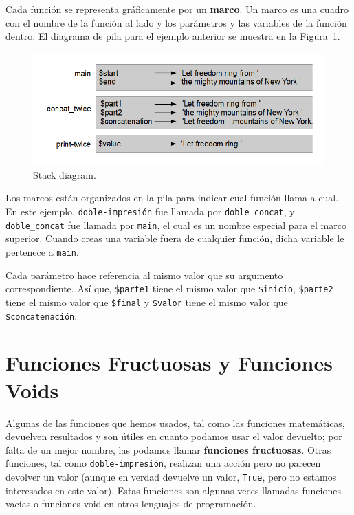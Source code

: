 Cada función se representa gráficamente por un {\bf marco}. Un marco
es una cuadro con el nombre de la función al lado y los parámetros y
las variables de la función dentro. El diagrama de pila 
para el ejemplo anterior se muestra en la Figura~\ref{fig.stack}.

\begin{figure}
\centerline
{\includegraphics[scale=0.8]{figs/stack_diagram.png}}
\caption{Stack diagram.}
\label{fig.stack}
\end{figure}

Los marcos están organizados en la pila para indicar cual función
llama a cual. En este ejemplo, \verb|doble-impresión| fue llamada
por \verb|doble_concat|, y \verb|doble_concat| fue llamada por 
\verb|main|, el cual es un nombre especial para el marco superior.
Cuando creas una variable fuera de cualquier función, dicha variable
le pertenece a \verb|main|.

Cada parámetro hace referencia al mismo valor que su argumento correspondiente.
Así que, {\tt \$parte1} tiene el mismo valor que {\tt \$inicio},
{\tt \$parte2} tiene el mismo valor que {\tt \$final} y {\tt \$valor}
tiene el mismo valor que {\tt \$concatenación}.



\section{Funciones Fructuosas y Funciones Voids}

Algunas de las funciones que hemos usados, tal como las 
funciones matemáticas, devuelven resultados y son útiles
en cuanto podamos usar el valor devuelto; por falta de un 
mejor nombre, las podamos llamar {\bf funciones fructuosas}.
Otras funciones, tal como \verb|doble-impresión|, realizan una
acción pero no parecen devolver un valor (aunque en verdad devuelve
un valor, {\tt True}, pero no estamos interesados en este valor).
Estas funciones son algunas veces llamadas funciones vacías o funciones
void en otros lenguajes de programación.

